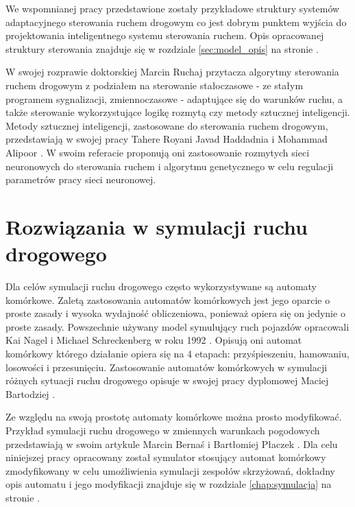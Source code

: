 We wspomnianej pracy przedstawione zostały przykładowe struktury systemów adaptacyjnego sterowania ruchem drogowym co jest dobrym punktem wyjścia do projektowania inteligentnego systemu sterowania ruchem. Opis opracowanej struktury sterowania znajduje się w rozdziale \ref{sec:model_opis} na stronie \pageref{sec:model_opis}.

W swojej rozprawie doktorskiej \cite{ruchaj} Marcin Ruchaj przytacza algorytmy sterowania ruchem drogowym z podziałem na sterowanie stałoczasowe - ze stałym programem sygnalizacji, zmiennoczasowe - adaptujące się do warunków ruchu, a także sterowanie wykorzystujące logikę rozmytą czy metody sztucznej inteligencji. Metody sztucznej inteligencji, zastosowane do sterowania ruchem drogowym, przedstawiają w swojej pracy Tahere Royani Javad Haddadnia i Mohammad Alipoor \cite{royani+haddadnia+alipoor}. W swoim referacie proponują oni zastosowanie rozmytych sieci neuronowych do sterowania ruchem i algorytmu genetycznego w celu regulacji parametrów pracy sieci neuronowej.

\section{Rozwiązania w symulacji ruchu drogowego}
Dla celów symulacji ruchu drogowego często wykorzystywane są automaty komórkowe. Zaletą zastosowania automatów komórkowych jest jego oparcie o proste zasady i wysoka wydajność obliczeniowa, ponieważ opiera się on jedynie o proste zasady. Powszechnie używany model symulujący ruch pojazdów opracowali Kai Nagel i Michael Schreckenberg w roku 1992 \cite{nasch}. Opisują oni automat komórkowy którego działanie opiera się na 4 etapach: przyśpieszeniu, hamowaniu, losowości i przesunięciu. Zastosowanie automatów komórkowych w symulacji różnych sytuacji ruchu drogowego opisuje w swojej pracy dyplomowej Maciej Bartodziej \cite{bartodziej}.

Ze względu na swoją prostotę automaty komórkowe można prosto modyfikować. Przykład symulacji ruchu drogowego w zmiennych warunkach pogodowych przedstawiają w swoim artykule Marcin Bernaś i Bartłomiej Płaczek \cite{bernas+placzek}. Dla celu niniejszej pracy opracowany został symulator stosujący automat komórkowy zmodyfikowany w celu umożliwienia symulacji zespołów skrzyżowań, dokładny opis automatu i jego modyfikacji znajduje się w rozdziale \ref{chap:symulacja} na stronie \pageref{chap:symulacja}.

